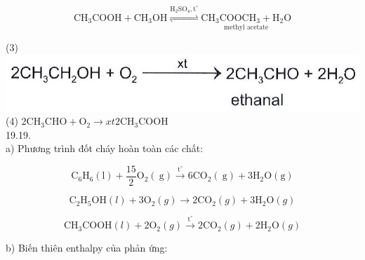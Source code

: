 \documentclass[10pt]{article}
\begin{document}
$$
\mathrm{CH}_{3} \mathrm{COOH}+\mathrm{CH}_{3} \mathrm{OH} \stackrel{\mathrm{H}_{2} \mathrm{SO}_{4}, \mathrm{t}^{\circ}}{\rightleftharpoons} \underset{\text { methyl acetate }}{\mathrm{CH}_{3} \mathrm{COOCH}_{3}+\mathrm{H}_{2} \mathrm{O}}
$$

(3)\\
\includegraphics[max width=\textwidth, center]{2025_10_23_adad5b98d65ac6665838g-41}\\
(4) $2 \mathrm{CH}_{3} \mathrm{CHO}+\mathrm{O}_{2} \longrightarrow x t 2 \mathrm{CH}_{3} \mathrm{COOH}$\\
19.19.\\
a) Phương trình đốt cháy hoàn toàn các chất:


\begin{equation*}
\mathrm{C}_{6} \mathrm{H}_{6}(\mathrm{l})+\frac{15}{2} \mathrm{O}_{2}(\mathrm{~g}) \xrightarrow{\mathrm{t}^{\circ}} 6 \mathrm{CO}_{2}(\mathrm{~g})+3 \mathrm{H}_{2} \mathrm{O}(\mathrm{g}) \tag{1}
\end{equation*}



\begin{equation*}
\mathrm{C}_{2} \mathrm{H}_{5} \mathrm{OH}(l)+3 \mathrm{O}_{2}(g) \longrightarrow 2 \mathrm{CO}_{2}(g)+3 \mathrm{H}_{2} \mathrm{O}(g) \tag{2}
\end{equation*}



\begin{equation*}
\mathrm{CH}_{3} \mathrm{COOH}(l)+2 \mathrm{O}_{2}(g) \xrightarrow{\mathrm{t}^{\circ}} 2 \mathrm{CO}_{2}(g)+2 \mathrm{H}_{2} \mathrm{O}(g) \tag{3}
\end{equation*}


b) Biến thiên enthalpy của phản ứng:
\end{document}
